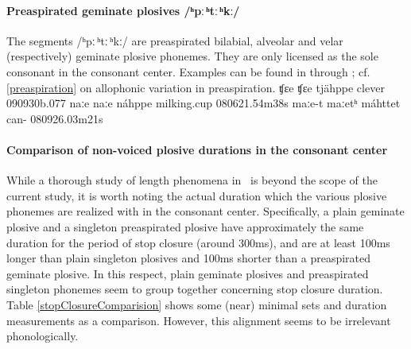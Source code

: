 \paragraph{Preaspirated geminate plosives /ʰpː\,ʰtː\,ʰkː/}
The segments \mbox{/ʰpː\,ʰtː\,ʰkː/} are preaspirated bilabial, alveolar and velar (respectively) geminate plosive phonemes. 
They are only licensed as the sole consonant in the consonant center.  
Examples can be found in  through ; cf. \SEC\ref{preaspiration} on allophonic variation in preaspiration. 
		{ʧɛe}		{ʧɛe}		{tjähppe}	{clever\BS{}}		{090930b}{.077}
	{naːe}	{naːe}	{náhppe}	{milking.cup\BS{}}	{080621}{.54m38s}
			{maːe-t}	{maːetʰ}	{máhttet}	{can-}			{080926}{.03m21s}


\paragraph[Non-voiced plosive durations in the consonant center]{Comparison of non-voiced plosive durations in the consonant center}\label{plosiveDurationComparison}
While a thorough study of length phenomena in \PS\ is beyond the scope of the current study, it is worth noting the actual duration which the various plosive phonemes are realized with in the consonant center. %
Specifically, %
a plain geminate plosive and a singleton preaspirated plosive have approximately the same duration for the period of stop closure (around 300ms), and are at least 100ms longer than plain singleton plosives and 100ms shorter than a preaspirated geminate plosive. In this respect, plain geminate plosives and preaspirated singleton phonemes seem to group together concerning stop closure duration. 
Table \vref{stopClosureComparision} %
shows some (near) minimal sets and duration measurements as a comparison. However, this alignment seems to be irrelevant phonologically. 


